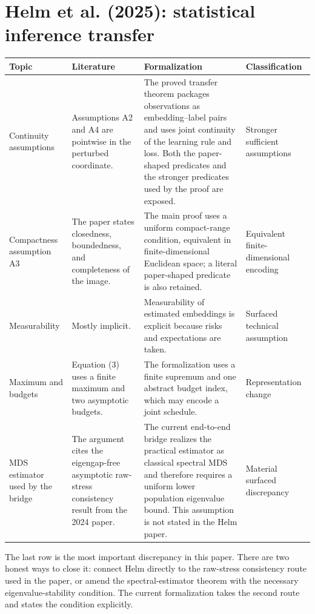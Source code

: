 \documentclass[11pt]{article}
\begin{document}
\section{Helm et al. (2025): statistical inference transfer}

\begin{longtable}{>{\raggedright\arraybackslash}p{}
                  >{\raggedright\arraybackslash}p{}
                  >{\raggedright\arraybackslash}p{}
                  >{\raggedright\arraybackslash}p{}}
\toprule
Topic & Literature & Formalization & Classification \\
\midrule
\endhead
Continuity assumptions & Assumptions A2 and A4 are pointwise in the perturbed
coordinate. & The proved transfer theorem packages observations as
embedding--label pairs and uses joint continuity of the learning rule and loss.
Both the paper-shaped predicates and the stronger predicates used by the proof
are exposed. & Stronger sufficient assumptions \\
\addlinespace
Compactness assumption A3 & The paper states closedness, boundedness, and
completeness of the image. & The main proof uses a uniform compact-range
condition, equivalent in finite-dimensional Euclidean space; a literal
paper-shaped predicate is also retained. & Equivalent finite-dimensional
encoding \\
\addlinespace
Measurability & Mostly implicit. & Measurability of estimated embeddings is
explicit because risks and expectations are taken. & Surfaced technical
assumption \\
\addlinespace
Maximum and budgets & Equation (3) uses a finite maximum and two asymptotic
budgets. & The formalization uses a finite supremum and one abstract budget
index, which may encode a joint schedule. & Representation change \\
\addlinespace
MDS estimator used by the bridge & The argument cites the eigengap-free
asymptotic raw-stress consistency result from the 2024 paper. & The current
end-to-end bridge realizes the practical estimator as classical spectral MDS
and therefore requires a uniform lower population eigenvalue bound.  This
assumption is not stated in the Helm paper. & Material surfaced discrepancy \\
\bottomrule
\end{longtable}

The last row is the most important discrepancy in this paper.  There are two
honest ways to close it: connect Helm directly to the raw-stress consistency
route used in the paper, or amend the spectral-estimator theorem with the
necessary eigenvalue-stability condition.  The current formalization takes the
second route and states the condition explicitly.
\end{document}
